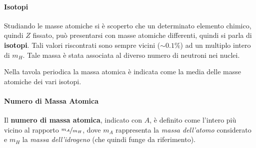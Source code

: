 \paragraph{Isotopi}
Studiando le masse atomiche si è scoperto che un determinato elemento chimico,
quindi $Z$ fissato, può presentarsi con masse atomiche differenti,
quindi si parla di \textbf{isotopi}. Tali valori riscontrati sono sempre vicini
($\sim 0.1\%$) ad un multiplo intero di $m_H$.
Tale massa è stata associata al diverso numero di neutroni nei nuclei.

Nella tavola periodica la massa atomica è indicata come la media delle masse
atomiche dei vari isotopi.

\paragraph{Numero di Massa Atomica}
Il \textbf{numero di massa atomica}, indicato con $A$, è definito come l'intero
più vicino al rapporto $\nicefrac{m_A}{m_H}$, dove $m_A$ rappresenta la
\textit{massa dell'atomo} considerato e $m_H$ la \textit{massa dell'idrogeno}
(che quindi funge da riferimento).


